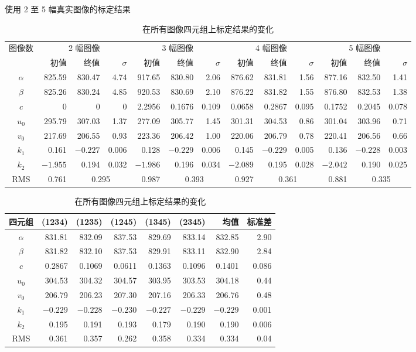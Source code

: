 \documentclass[a4paper,twocolumn,zihao=5,fontset=none,UTF8]{ctexart}
\begin{document}
\begin{table}[t]
  \centering
  \caption{使用 2 至 5 幅真实图像的标定结果}
  \small
  \setlength{\tabcolsep}{4.2pt}
  \begin{tabular}{c|rrr|rrr|rrr|rrr}
    \toprule
    图像数 & \multicolumn{3}{c|}{2 幅图像} & \multicolumn{3}{c|}{3 幅图像} & \multicolumn{3}{c|}{4 幅图像} & \multicolumn{3}{c}{5 幅图像}\\
     & 初值 & 终值 & $\sigma$ & 初值 & 终值 & $\sigma$ & 初值 & 终值 & $\sigma$ & 初值 & 终值 & $\sigma$\\
    \midrule
    $\alpha$ & 825.59 & 830.47 & 4.74 & 917.65 & 830.80 & 2.06 & 876.62 & 831.81 & 1.56 & 877.16 & 832.50 & 1.41\\
    $\beta$ & 825.26 & 830.24 & 4.85 & 920.53 & 830.69 & 2.10 & 876.22 & 831.82 & 1.55 & 876.80 & 832.53 & 1.38\\
    $c$ & 0 & 0 & 0 & 2.2956 & 0.1676 & 0.109 & 0.0658 & 0.2867 & 0.095 & 0.1752 & 0.2045 & 0.078\\
    $u_0$ & 295.79 & 307.03 & 1.37 & 277.09 & 305.77 & 1.45 & 301.31 & 304.53 & 0.86 & 301.04 & 303.96 & 0.71\\
    $v_0$ & 217.69 & 206.55 & 0.93 & 223.36 & 206.42 & 1.00 & 220.06 & 206.79 & 0.78 & 220.41 & 206.56 & 0.66\\
    $k_1$ & 0.161 & $-0.227$ & 0.006 & 0.128 & $-0.229$ & 0.006 & 0.145 & $-0.229$ & 0.005 & 0.136 & $-0.228$ & 0.003\\
    $k_2$ & $-1.955$ & 0.194 & 0.032 & $-1.986$ & 0.196 & 0.034 & $-2.089$ & 0.195 & 0.028 & $-2.042$ & 0.190 & 0.025\\
    \midrule
    RMS & 0.761 & \multicolumn{2}{c|}{0.295} & 0.987 & \multicolumn{2}{c|}{0.393} & 0.927 & \multicolumn{2}{c|}{0.361} & 0.881 & \multicolumn{2}{c}{0.335}\\
    \bottomrule
  \end{tabular}

  \vspace{10pt}
  \caption{在所有图像四元组上标定结果的变化}
  \begin{tabular}{c|rrrrr|rr}
    \toprule
    四元组 & (1234) & (1235) & (1245) & (1345) & (2345) & 均值 & 标准差\\
    \midrule
    $\alpha$ & 831.81 & 832.09 & 837.53 & 829.69 & 833.14 & 832.85 & 2.90\\
    $\beta$ & 831.82 & 832.10 & 837.53 & 829.91 & 833.11 & 832.90 & 2.84\\
    $c$ & 0.2867 & 0.1069 & 0.0611 & 0.1363 & 0.1096 & 0.1401 & 0.086\\
    $u_0$ & 304.53 & 304.32 & 304.57 & 303.95 & 303.53 & 304.18 & 0.44\\
    $v_0$ & 206.79 & 206.23 & 207.30 & 207.16 & 206.33 & 206.76 & 0.48\\
    $k_1$ & $-0.229$ & $-0.228$ & $-0.230$ & $-0.227$ & $-0.229$ & $-0.229$ & 0.001\\
    $k_2$ & 0.195 & 0.191 & 0.193 & 0.179 & 0.190 & 0.190 & 0.006\\
    \midrule
    RMS & 0.361 & 0.357 & 0.262 & 0.358 & 0.334 & 0.334 & 0.04\\
    \bottomrule
  \end{tabular}
\end{table}
\end{document}
